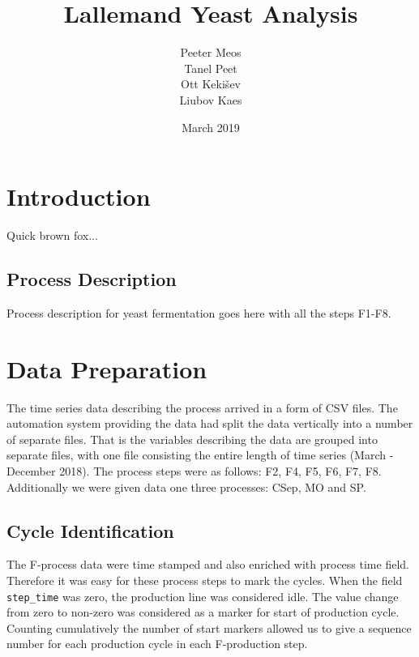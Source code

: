 \documentclass{article}
\title{Lallemand Yeast Analysis}
\author{Peeter Meos \\ Tanel Peet \\Ott Keki{\v s}ev \\ Liubov Kaes}
\date{March 2019}
\begin{document}
\maketitle

\tableofcontents

\section{Introduction}
Quick brown fox...
\subsection{Process Description}
Process description for yeast fermentation goes here with all the steps F1-F8.

\section{Data Preparation}
The time series data describing the process arrived in a form of CSV files. The automation system providing the data had split the data vertically into a number of separate files. That is the variables describing the data are grouped into separate files, with one file consisting the entire length of time series (March - December 2018). The process steps were as follows: F2, F4, F5, F6, F7, F8. Additionally we were given data one three processes: CSep, MO and SP. 

\subsection{Cycle Identification}
The F-process data were time stamped and also enriched with process time field. Therefore it was easy for these process steps to mark the cycles. When the field \texttt{step\_time} was zero, the production line was considered idle. The value change from zero to non-zero was considered as a marker for start of production cycle. Counting cumulatively the number of start markers allowed us to give a sequence number for each production cycle in each F-production step.
\end{document}
